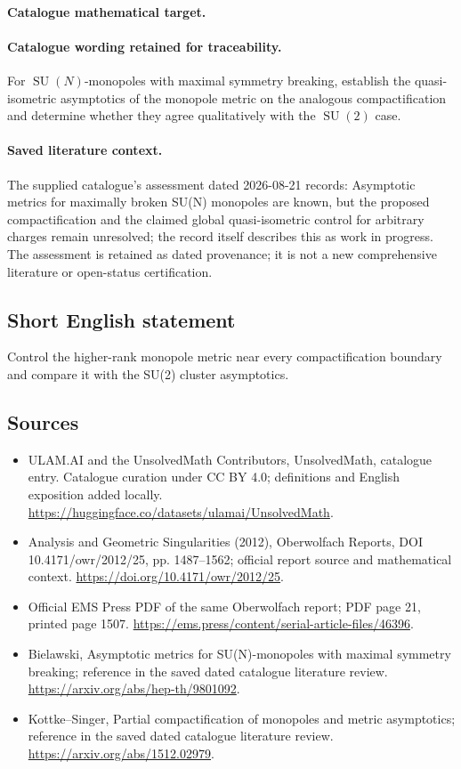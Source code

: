 \documentclass[11pt]{article}
\begin{document}
\paragraph{Catalogue mathematical target.}
\paragraph{Catalogue wording retained for traceability.}
For $\operatorname{SU}(N)$-monopoles with maximal symmetry breaking, establish the quasi-isometric asymptotics of the monopole metric on the analogous compactification and determine whether they agree qualitatively with the $\operatorname{SU}(2)$ case.

\paragraph{Saved literature context.} The supplied catalogue's assessment dated 2026-08-21 records: Asymptotic metrics for maximally broken SU(N) monopoles are known, but the proposed compactification and the claimed global quasi-isometric control for arbitrary charges remain unresolved; the record itself describes this as work in progress. The assessment is retained as dated provenance; it is not a new comprehensive literature or open-status certification.
\subsection{Short English statement}
Control the higher-rank monopole metric near every compactification boundary and compare it with the SU(2) cluster asymptotics.
\subsection{Sources}
\begin{itemize}
\item[\hypertarget{source:statement:1}{S1}] ULAM.AI and the UnsolvedMath Contributors, UnsolvedMath, catalogue entry. Catalogue curation under CC BY 4.0; definitions and English exposition added locally.
\url{https://huggingface.co/datasets/ulamai/UnsolvedMath}.
\item[\hypertarget{source:statement:2}{S2}] Analysis and Geometric Singularities (2012), Oberwolfach Reports, DOI 10.4171/owr/2012/25, pp. 1487--1562; official report source and mathematical context.
\url{https://doi.org/10.4171/owr/2012/25}.
\item[\hypertarget{source:statement:3}{S3}] Official EMS Press PDF of the same Oberwolfach report; PDF page 21, printed page 1507.
\url{https://ems.press/content/serial-article-files/46396}.
\item[\hypertarget{source:statement:4}{S4}] Bielawski, Asymptotic metrics for SU(N)-monopoles with maximal symmetry breaking; reference in the saved dated catalogue literature review.
\url{https://arxiv.org/abs/hep-th/9801092}.
\item[\hypertarget{source:statement:5}{S5}] Kottke--Singer, Partial compactification of monopoles and metric asymptotics; reference in the saved dated catalogue literature review.
\url{https://arxiv.org/abs/1512.02979}.
\end{itemize}
\label{end:statement}
\end{document}
